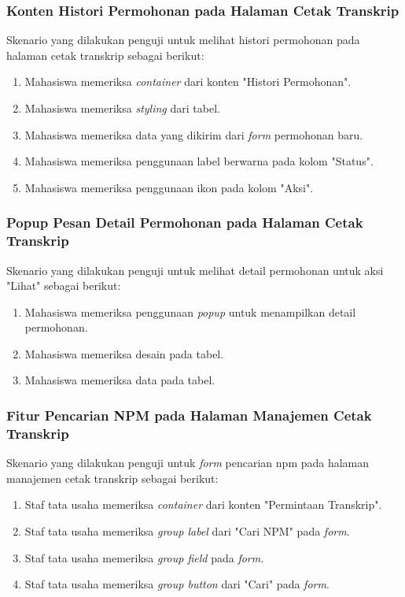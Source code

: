 \subsubsection{Konten Histori Permohonan pada Halaman Cetak Transkrip}
Skenario yang dilakukan penguji untuk melihat histori permohonan pada halaman cetak transkrip sebagai berikut:
\begin{enumerate}
	\item Mahasiswa memeriksa \textit{container} dari konten "Histori Permohonan".
	\item Mahasiswa memeriksa \textit{styling} dari tabel.	
	\item Mahasiswa memeriksa data yang dikirim dari \textit{form} permohonan baru.
	\item Mahasiswa memeriksa penggunaan label berwarna pada kolom "Status".		
	\item Mahasiswa memeriksa penggunaan ikon pada kolom "Aksi".	
\end{enumerate}

\subsubsection{Popup Pesan Detail Permohonan pada Halaman Cetak Transkrip}
Skenario yang dilakukan penguji untuk melihat detail permohonan untuk aksi "Lihat" sebagai berikut:
\begin{enumerate}
	\item Mahasiswa memeriksa penggunaan \textit{popup} untuk menampilkan detail permohonan.
	\item Mahasiswa memeriksa desain pada tabel.
	\item Mahasiswa memeriksa data pada tabel.
\end{enumerate}

\subsubsection{Fitur Pencarian NPM pada Halaman Manajemen Cetak Transkrip}
Skenario yang dilakukan penguji untuk \textit{form} pencarian npm pada halaman manajemen cetak transkrip sebagai berikut:
\begin{enumerate}
	\item Staf tata usaha memeriksa \textit{container} dari konten "Permintaan Transkrip".
	\item Staf tata usaha memeriksa \textit{group label} dari "Cari NPM" pada \textit{form}.	
	\item Staf tata usaha memeriksa \textit{group field} pada \textit{form}.	
	\item Staf tata usaha memeriksa \textit{group button} dari "Cari" pada \textit{form}.
\end{enumerate}

